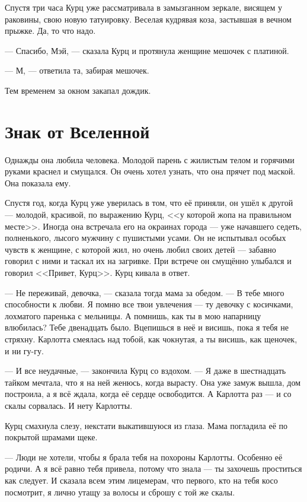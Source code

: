 Спустя три часа Курц уже рассматривала в замызганном зеркале, висящем у раковины, свою новую татуировку.
Веселая кудрявая коза, застывшая в вечном прыжке.
Да, то что надо.

--- Спасибо, Мэй, --- сказала Курц и протянула женщине мешочек с платиной.

--- М, --- ответила та, забирая мешочек.

Тем временем за окном закапал дождик.

\section{Знак от Вселенной}

Однажды она любила человека.
Молодой парень с жилистым телом и горячими руками краснел и смущался.
Он очень хотел узнать, что она прячет под маской.
Она показала ему.

Спустя год, когда Курц уже уверилась в том, что её приняли, он ушёл к другой --- молодой, красивой, по выражению Курц, <<у которой жопа на правильном месте>>.
Иногда она встречала его на окраинах города --- уже начавшего седеть, полненького, лысого мужчину с пушистыми усами.
Он не испытывал особых чувств к женщине, с которой жил, но очень любил своих детей --- забавно говорил с ними и таскал их на загривке.
При встрече он смущённо улыбался и говорил <<Привет, Курц>>.
Курц кивала в ответ.

--- Не переживай, девочка, --- сказала тогда мама за обедом.
--- В тебе много способности к любви.
Я помню все твои увлечения --- ту девочку с косичками, лохматого паренька с мельницы.
А помнишь, как ты в мою напарницу влюбилась?
Тебе двенадцать было.
Вцепишься в неё и висишь, пока я тебя не стряхну.
Карлотта смеялась над тобой, как чокнутая, а ты висишь, как щеночек, и ни гу-гу.

--- И все неудачные, --- закончила Курц со вздохом.
--- Я даже в шестнадцать тайком мечтала, что я на ней женюсь, когда вырасту.
Она уже замуж вышла, дом построила, а я всё ждала, когда её сердце освободится.
А Карлотта раз --- и со скалы сорвалась.
И нету Карлотты.

Курц смахнула слезу, некстати выкатившуюся из глаза.
Мама погладила её по покрытой шрамами щеке.

--- Люди не хотели, чтобы я брала тебя на похороны Карлотты.
Особенно её родичи.
А я всё равно тебя привела, потому что знала --- ты захочешь проститься как следует.
И сказала всем этим лицемерам, что первого, кто на тебя косо посмотрит, я лично утащу за волосы и сброшу с той же скалы.

